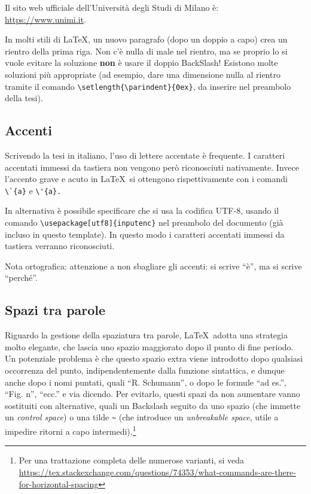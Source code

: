 \documentclass[12pt]{report}
\begin{document}
Il sito web ufficiale dell'Università degli Studi di Milano è:\\
\url{https://www.unimi.it}.

In molti stili di \LaTeX, un nuovo paragrafo (dopo un doppio a capo) crea un rientro della prima riga. Non c'\`e nulla di male nel rientro, ma se proprio lo si vuole evitare la soluzione \textbf{non} \`e usare il doppio BackSlash! Esistono molte soluzioni pi\`u appropriate (ad esempio, dare una dimensione nulla al rientro tramite il comando \verb|\setlength{\parindent}{0ex}|, da inserire nel preambolo della tesi).

\subsection{Accenti}

Scrivendo la tesi in italiano, l'uso di lettere accentate \`e frequente. I caratteri accentati immessi da tastiera non vengono per\`o riconosciuti nativamente. Invece l'accento grave e acuto in \LaTeX\ si ottengono rispettivamente con i comandi \verb|\`{a}| e \verb|\'{a}.| 

In alternativa \`e possibile specificare che si usa la codifica UTF-8, usando il comando \verb|\usepackage[utf8]{inputenc}| nel preambolo del documento (già incluso in questo template). In questo modo i caratteri accentati immessi da tastiera verranno riconosciuti.

Nota ortografica: attenzione a non sbagliare gli accenti: si scrive ``\`e'', ma si scrive ``perch\'e''.

\subsection{Spazi tra parole}

Riguardo la gestione della spaziatura tra parole, \LaTeX\ adotta una strategia molto elegante, che lascia uno spazio maggiorato dopo il punto di fine periodo. Un potenziale problema è che questo spazio extra viene introdotto dopo qualsiasi occorrenza del punto, indipendentemente dalla funzione sintattica, e dunque anche dopo i nomi puntati, quali ``R. Schumann'', o dopo le formule ``ad es.'', ``Fig. n'', ``ecc.'' e via dicendo. Per evitarlo, questi spazi da non aumentare vanno sostituiti con alternative, quali un Backslash seguito da uno spazio (che immette un \textit{control space}) o una tilde \verb|~| (che introduce un \textit{unbreakable space}, utile a impedire ritorni a capo intermedi).\footnote{Per una trattazione completa delle numerose varianti, si veda \url{https://tex.stackexchange.com/questions/74353/what-commands-are-there-for-horizontal-spacing}}
\end{document}
